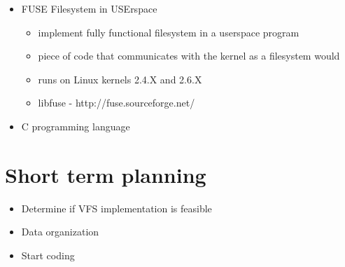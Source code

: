 \documentclass{beamer}
\begin{document}
\begin{frame}
  \begin{itemize}
  \item FUSE  Filesystem in USErspace
	\begin{itemize}
	\item implement fully functional filesystem in a userspace program 
	\item piece of code that communicates with the kernel as a filesystem would
	\item runs on Linux kernels 2.4.X and 2.6.X
    \item libfuse - http://fuse.sourceforge.net/
    \end{itemize}
  \item C programming language
  \end{itemize}
\end{frame}

\section{Short term planning}

\begin{frame}
  \begin{itemize}
    \item Determine if VFS implementation is feasible
    \item Data organization
    \item Start coding
  \end{itemize}
\end{frame}
\end{document}
